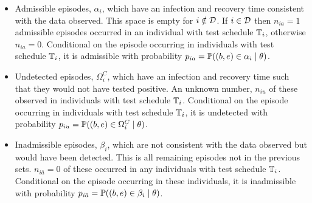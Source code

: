 \documentclass[thesis.tex]{subfiles}
\begin{document}
\begin{itemize}
\item
  Admissible episodes, $\alpha_i$, which have an infection and recovery time consistent with the data observed.
  This space is empty for $i \notin \mathcal{D}$.
  If $i \in \mathcal{D}$ then $n_{ia} =1$ admissible episodes occurred in an individual with test schedule $\mathbb{T}_{i}$, otherwise $n_{ia} = 0$.
  Conditional on the episode occurring in individuals with test schedule $\mathbb{T}_i$, it is admissible with probability $p_{ia} = \operatorname{\mathbb{P}}((b, e) \in \alpha_i \mid \theta)$.
  \label{perf-test:def:admissible}
\item
  Undetected episodes, $\Omega_i^C$, which have an infection and recovery time such that they would not have tested positive.
  An unknown number, $n_{iu}$ of these observed in individuals with test schedule $\mathbb{T}_i$.
  Conditional on the episode occurring in individuals with test schedule $\mathbb{T}_i$, it is undetected with probability $p_{iu} = \operatorname{\mathbb{P}}((b, e) \in \Omega^C_i \mid \theta)$.
\item
  Inadmissible episodes, $\beta_i$, which are not consistent with the data observed but would have been
  detected.
  This is all remaining episodes not in the previous sets.
  $n_{i\bar{a}} = 0$ of these occurred in any individuals with test schedule $\mathbb{T}_i$.
  Conditional on the episode occurring in these individuals, it is inadmissible with probability $p_{i\bar{a}} = \operatorname{\mathbb{P}}((b, e) \in \beta_i \mid \theta)$.
\end{itemize}

\end{document}
